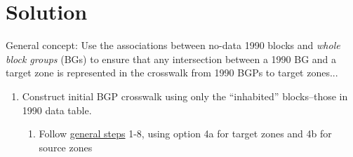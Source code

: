 \documentclass{article}
\begin{document}
\section{Solution}

General concept: Use the associations between no-data 1990 blocks and \textit{whole block groups} (BGs) to ensure that any intersection between a 1990 BG and a target zone is represented in the crosswalk from 1990 BGPs to target zones...

\begin{enumerate}

\item Construct initial BGP crosswalk using only the ``inhabited'' blocks--those in 1990 data table.
    \begin{enumerate}
    \item Follow \href{https://github.com/ipums/nhgisxwalk/blob/master/resources/frameworks/general-crosswalk-construction-framework.pdf}{general steps} 1-8, using option 4a for target zones and 4b for source zones
    \end{enumerate}


\end{enumerate}
\end{document}
